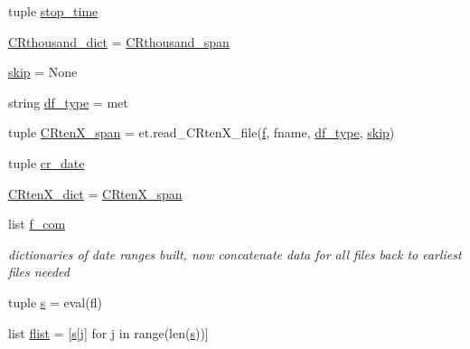 \begin{DoxyCompactItemize}
\item 
tuple \hyperlink{namespace_date___ranges___concat__mod_a40103ea9df455cc76da5d14434fc98d6}{stop\+\_\+time}
\item 
\hyperlink{namespace_date___ranges___concat__mod_aed55c0f2337263c5b111a95e50e59ff0}{C\+Rthousand\+\_\+dict} = \hyperlink{namespace_date___ranges___concat__mod_a222cab6f1387a2cfc5fda108d2d28b4c}{C\+Rthousand\+\_\+span}
\item 
\hyperlink{namespace_date___ranges___concat__mod_ae17bce25297454c5f14191f6dac1da6e}{skip} = None
\item 
string \hyperlink{namespace_date___ranges___concat__mod_a9af9fbcb29f8cbf5b5bec5151e049dec}{df\+\_\+type} = \textquotesingle{}met\textquotesingle{}
\item 
tuple \hyperlink{namespace_date___ranges___concat__mod_a96b8428f6b55ed287af44aaa3fcd747c}{C\+Rten\+X\+\_\+span} = et.\+read\+\_\+\+C\+Rten\+X\+\_\+file(\hyperlink{namespace_date___ranges___concat__mod_a703db4502ab158179b3d9fe9cef2192f}{f}, fname, \hyperlink{namespace_date___ranges___concat__mod_a9af9fbcb29f8cbf5b5bec5151e049dec}{df\+\_\+type}, \hyperlink{namespace_date___ranges___concat__mod_ae17bce25297454c5f14191f6dac1da6e}{skip})
\item 
tuple \hyperlink{namespace_date___ranges___concat__mod_a8e5a8306d6695519f7c0eb6127389f66}{cr\+\_\+date}
\item 
\hyperlink{namespace_date___ranges___concat__mod_a978f5d0373d453df68f135bdb1186308}{C\+Rten\+X\+\_\+dict} = \hyperlink{namespace_date___ranges___concat__mod_a96b8428f6b55ed287af44aaa3fcd747c}{C\+Rten\+X\+\_\+span}
\item 
list \hyperlink{namespace_date___ranges___concat__mod_a35c7680de747e23cf993a72703f9ac07}{f\+\_\+com}
\begin{DoxyCompactList}\small\item\em dictionaries of date ranges built, now concatenate data for all files back to earliest files needed \end{DoxyCompactList}\item 
tuple \hyperlink{namespace_date___ranges___concat__mod_accfa90ffb586c78876af1d026419e456}{s} = eval(fl)
\item 
list \hyperlink{namespace_date___ranges___concat__mod_af5136898921d16fda0cf4e1f27148e0a}{flist} = \mbox{[}\hyperlink{namespace_date___ranges___concat__mod_accfa90ffb586c78876af1d026419e456}{s}\mbox{[}j\mbox{]} for j in range(len(\hyperlink{namespace_date___ranges___concat__mod_accfa90ffb586c78876af1d026419e456}{s}))\mbox{]}

\end{DoxyCompactItemize}
